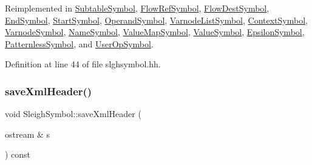 Reimplemented in \mbox{\hyperlink{class_subtable_symbol_afe8d899ddb52fcdc4b26510042015b8b}{Subtable\+Symbol}}, \mbox{\hyperlink{class_flow_ref_symbol_a6e4019b02ff19539264b2a717828483c}{Flow\+Ref\+Symbol}}, \mbox{\hyperlink{class_flow_dest_symbol_a2323c675f5969475af4030a87ae45319}{Flow\+Dest\+Symbol}}, \mbox{\hyperlink{class_end_symbol_a282237b2af7aa91526261d94580c77b2}{End\+Symbol}}, \mbox{\hyperlink{class_start_symbol_a112704e744706c7787bdc7a594845b47}{Start\+Symbol}}, \mbox{\hyperlink{class_operand_symbol_a20b491e8a76d47973fe52df326d9ce38}{Operand\+Symbol}}, \mbox{\hyperlink{class_varnode_list_symbol_a4b95e5f5b2c0ebd4a0eee076c9ed96de}{Varnode\+List\+Symbol}}, \mbox{\hyperlink{class_context_symbol_ad8c4f39c37d11ed5f0fd7bf4eb59dca6}{Context\+Symbol}}, \mbox{\hyperlink{class_varnode_symbol_aed153df5b4c3fdb8c04bf422e2ea329b}{Varnode\+Symbol}}, \mbox{\hyperlink{class_name_symbol_a0f97f18cff09e4c67e8bb8d54c392031}{Name\+Symbol}}, \mbox{\hyperlink{class_value_map_symbol_aacceef585b6af757603b310a7173b860}{Value\+Map\+Symbol}}, \mbox{\hyperlink{class_value_symbol_aa7b4012d522c5864aea52486b0d47978}{Value\+Symbol}}, \mbox{\hyperlink{class_epsilon_symbol_a825d93a75ea8a0d3c3448ce5abef3f27}{Epsilon\+Symbol}}, \mbox{\hyperlink{class_patternless_symbol_a4afb029a1e6456ffa90468cb29587529}{Patternless\+Symbol}}, and \mbox{\hyperlink{class_user_op_symbol_a51162d8d46fb1d515d65a5b56d2864d4}{User\+Op\+Symbol}}.



Definition at line 44 of file slghsymbol.\+hh.

\mbox{\label{class_sleigh_symbol_ac501be7c584bc0568c29fb95910962e9}} 
\subsubsection{\texorpdfstring{saveXmlHeader()}{saveXmlHeader()}}
{\footnotesize\ttfamily void Sleigh\+Symbol\+::save\+Xml\+Header (\begin{DoxyParamCaption}\item[{ostream \&}]{s }\end{DoxyParamCaption}) const\hspace{0.3cm}{\ttfamily [virtual]}}



